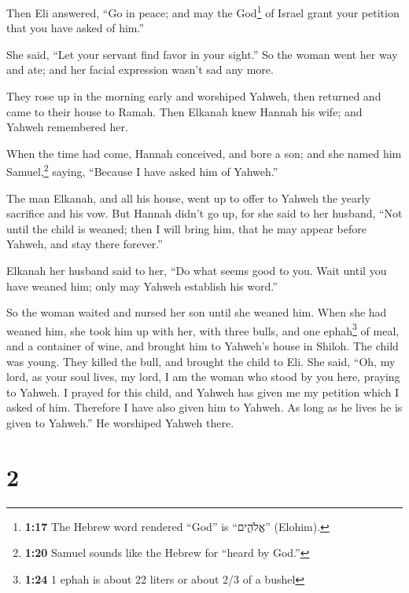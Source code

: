  Then Eli answered, ``Go in peace; and may the
God\footnote{\textbf{1:17} The Hebrew word rendered ``God'' is
  ``אֱלֹהִ֑ים'' (Elohim).} of Israel grant your petition that you have
asked of him.''

 She said, ``Let your servant find favor in your sight.''
So the woman went her way and ate; and her facial expression wasn't sad
any more.

 They rose up in the morning early and worshiped Yahweh,
then returned and came to their house to Ramah. Then Elkanah knew Hannah
his wife; and Yahweh remembered her.

 When the time had come, Hannah conceived, and bore a
son; and she named him Samuel,\footnote{\textbf{1:20} Samuel sounds like
  the Hebrew for ``heard by God.''} saying, ``Because I have asked him
of Yahweh.''

 The man Elkanah, and all his house, went up to offer to
Yahweh the yearly sacrifice and his vow.  But Hannah
didn't go up, for she said to her husband, ``Not until the child is
weaned; then I will bring him, that he may appear before Yahweh, and
stay there forever.''

 Elkanah her husband said to her, ``Do what seems good to
you. Wait until you have weaned him; only may Yahweh establish his
word.''

So the woman waited and nursed her son until she weaned him.
 When she had weaned him, she took him up with her, with
three bulls, and one ephah\footnote{\textbf{1:24} 1 ephah is about 22
  liters or about 2/3 of a bushel} of meal, and a container of wine, and
brought him to Yahweh's house in Shiloh. The child was young.
 They killed the bull, and brought the child to Eli.
 She said, ``Oh, my lord, as your soul lives, my lord, I
am the woman who stood by you here, praying to Yahweh.  I
prayed for this child, and Yahweh has given me my petition which I asked
of him.  Therefore I have also given him to Yahweh. As
long as he lives he is given to Yahweh.'' He worshiped Yahweh there.

\hypertarget{section-1}{%
\section{2}\label{section-1}}

